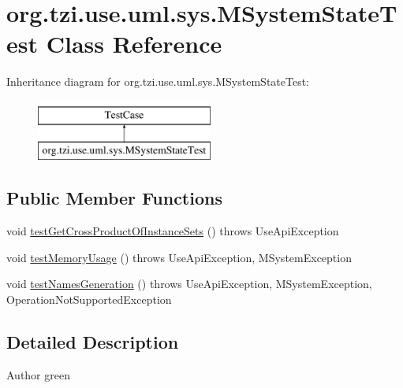 \hypertarget{classorg_1_1tzi_1_1use_1_1uml_1_1sys_1_1_m_system_state_test}{\section{org.\-tzi.\-use.\-uml.\-sys.\-M\-System\-State\-Test Class Reference}
\label{classorg_1_1tzi_1_1use_1_1uml_1_1sys_1_1_m_system_state_test}
}
Inheritance diagram for org.\-tzi.\-use.\-uml.\-sys.\-M\-System\-State\-Test\-:\begin{figure}[H]
\begin{center}
\leavevmode
\includegraphics[height=2.000000cm]{classorg_1_1tzi_1_1use_1_1uml_1_1sys_1_1_m_system_state_test}
\end{center}
\end{figure}
\subsection*{Public Member Functions}
\begin{DoxyCompactItemize}
\item 
void \hyperlink{classorg_1_1tzi_1_1use_1_1uml_1_1sys_1_1_m_system_state_test_a3e24ddb35e30adcebcbfecd80e2c05fa}{test\-Get\-Cross\-Product\-Of\-Instance\-Sets} ()  throws Use\-Api\-Exception 
\item 
void \hyperlink{classorg_1_1tzi_1_1use_1_1uml_1_1sys_1_1_m_system_state_test_af0f395aa59687d3d4009531f178e5ecc}{test\-Memory\-Usage} ()  throws Use\-Api\-Exception, M\-System\-Exception 
\item 
void \hyperlink{classorg_1_1tzi_1_1use_1_1uml_1_1sys_1_1_m_system_state_test_ad93987ca29951de233e617c4bda27636}{test\-Names\-Generation} ()  throws Use\-Api\-Exception, M\-System\-Exception, Operation\-Not\-Supported\-Exception 
\end{DoxyCompactItemize}


\subsection{Detailed Description}
\begin{DoxyAuthor}{Author}
green 
\end{DoxyAuthor}


